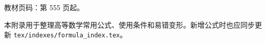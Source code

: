 
\begin{knowledgeBox}
教材页码：第 555 页起。

本附录用于整理高等数学常用公式、使用条件和易错变形。新增公式时也应同步更新 \texttt{tex/indexes/formula\_index.tex}。
\end{knowledgeBox}
